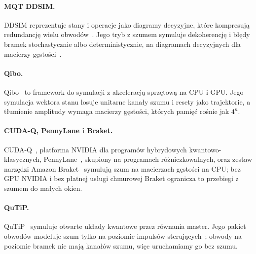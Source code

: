 \documentclass{scspaperproc}
\begin{document}
\paragraph{MQT DDSIM.}
DDSIM reprezentuje stany i operacje jako diagramy decyzyjne, które kompresują
redundancję wielu obwodów~\cite{zulehner2019ddsim}. Jego tryb z szumem
symuluje dekoherencję i błędy bramek stochastycznie albo deterministycznie, na
diagramach decyzyjnych dla macierzy gęstości~\cite{grurl2020noise}.

\paragraph{Qibo.}
Qibo~\cite{efthymiou2022qibo} to framework do symulacji z akceleracją
sprzętową na CPU i GPU. Jego symulacja wektora stanu losuje unitarne kanały
szumu i resety jako trajektorie, a tłumienie amplitudy wymaga macierzy
gęstości, których pamięć rośnie jak $4^n$.

\paragraph{CUDA-Q, PennyLane i Braket.}
CUDA-Q~\cite{kim2023cudaq}, platforma NVIDIA dla programów hybrydowych
kwantowo-klasycznych, PennyLane~\cite{bergholm2018pennylane}, skupiony na
programach różniczkowalnych, oraz zestaw narzędzi Amazon Braket~\cite{braket}
symulują szum na macierzach gęstości na CPU; bez GPU NVIDIA i bez płatnej
usługi chmurowej Braket ogranicza to przebiegi z szumem do małych okien.

\paragraph{QuTiP.}
QuTiP~\cite{johansson2013qutip,lambert2024qutip5} symuluje otwarte układy
kwantowe przez równania master. Jego pakiet obwodów modeluje szum tylko na
poziomie impulsów sterujących~\cite{li2022qutipqip}; obwody na poziomie bramek
nie mają kanałów szumu, więc uruchamiamy go bez szumu.
\end{document}
